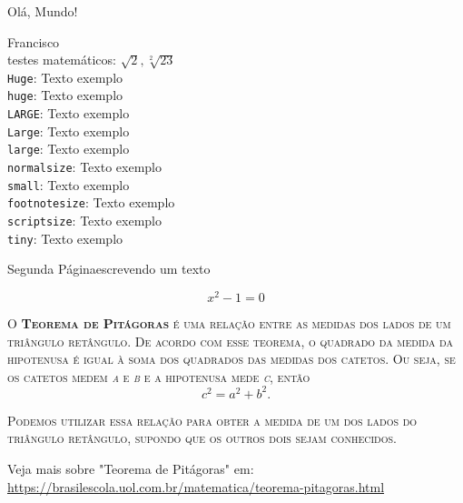 \documentclass[12pt]{article}
\begin{document}
Olá, Mundo!  

Francisco\\
testes matemáticos: $\sqrt{2}, \sqrt[2]{23}$ \\

\noindent \texttt{Huge}:         {\Huge Texto exemplo} \\
\noindent \texttt{huge}:         {\huge Texto exemplo} \\
\noindent \texttt{LARGE}:        {\LARGE Texto exemplo} \\
\noindent \texttt{Large}:        {\Large Texto exemplo} \\
\noindent \texttt{large}:        {\large Texto exemplo} \\
\noindent \texttt{normalsize}:   {\normalsize Texto exemplo} \\
\noindent \texttt{small}:        {\small Texto exemplo} \\
\noindent \texttt{footnotesize}: {\footnotesize Texto exemplo} \\
\noindent \texttt{scriptsize}:   {\scriptsize Texto exemplo} \\
\noindent \texttt{tiny}:         {\tiny Texto exemplo}

\newpage

Segunda Página\hspace{2cm}escrevendo um texto

\begin{equation}
x^2 - 1 = 0
\end{equation}


\noindent\textsc{O \textbf{Teorema de Pitágoras} é uma relação entre as medidas dos lados
de um triângulo retângulo. De acordo com esse teorema, o quadrado da medida
da hipotenusa é igual à soma dos quadrados das medidas dos catetos.
Ou seja, se os catetos medem \textit{a} e \textit{b} e a hipotenusa mede \textit{c}, então}
\begin{equation}
    c^2 = a^2 + b^2.
\end{equation}

\noindent\textsc{Podemos utilizar essa relação para obter a medida de um
dos lados do triângulo retângulo, supondo que os outros dois sejam conhecidos.}

Veja mais sobre "Teorema de Pitágoras" em: \url{https://brasilescola.uol.com.br/matematica/teorema-pitagoras.html}
\end{document}
